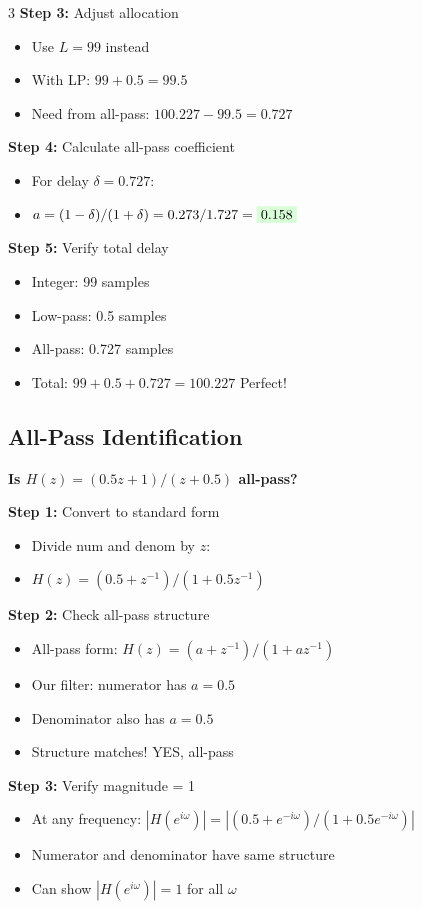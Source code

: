 \documentclass[10pt,landscape,a4paper]{article}
\newcommand{\problem}[1]{\textbf{\colorbox{cyan!15}{#1}}}
\newcommand{\answer}[1]{\colorbox{green!15}{#1}}
\begin{document}
\begin{multicols}{3}
\textbf{Step 3:} Adjust allocation
\begin{itemize}
\item Use $L = 99$ instead
\item With LP: $99 + 0.5 = 99.5$
\item Need from all-pass: $100.227 - 99.5 = 0.727$
\end{itemize}

\textbf{Step 4:} Calculate all-pass coefficient
\begin{itemize}
\item For delay $\delta = 0.727$:
\item $a = (1-\delta)/(1+\delta) = 0.273/1.727 = \answer{0.158}$
\end{itemize}

\textbf{Step 5:} Verify total delay
\begin{itemize}
\item Integer: 99 samples
\item Low-pass: 0.5 samples
\item All-pass: 0.727 samples
\item Total: $99 + 0.5 + 0.727 = 100.227$ \answer{Perfect!}
\end{itemize}

\subsection*{All-Pass Identification}

\problem{Is $H(z) = (0.5z + 1)/(z + 0.5)$ all-pass?}

\textbf{Step 1:} Convert to standard form
\begin{itemize}
\item Divide num and denom by $z$:
\item $H(z) = (0.5 + z^{-1})/(1 + 0.5z^{-1})$
\end{itemize}

\textbf{Step 2:} Check all-pass structure
\begin{itemize}
\item All-pass form: $H(z) = (a + z^{-1})/(1 + az^{-1})$
\item Our filter: numerator has $a = 0.5$
\item Denominator also has $a = 0.5$
\item Structure matches! \answer{YES, all-pass}
\end{itemize}

\textbf{Step 3:} Verify magnitude = 1
\begin{itemize}
\item At any frequency: $|H(e^{i\omega})| = |(0.5 + e^{-i\omega})/(1 + 0.5e^{-i\omega})|$
\item Numerator and denominator have same structure
\item Can show $|H(e^{i\omega})| = 1$ for all $\omega$
\end{itemize}


\end{multicols}
\end{document}
